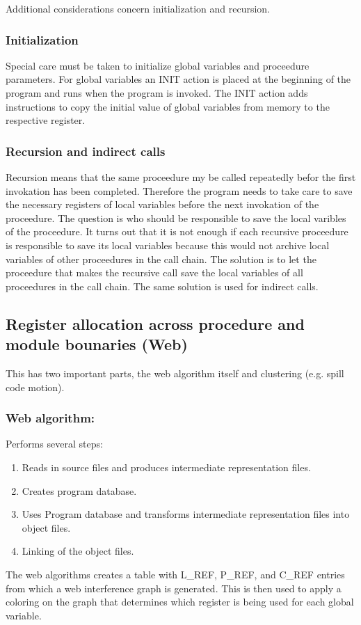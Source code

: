 \documentclass[a4paper,10pt]{article}
\begin{document}
Additional considerations concern initialization and recursion.

\subsubsection*{Initialization}
Special care must be taken to initialize global variables and proceedure parameters. For global variables an INIT action is placed at the
beginning of the program and runs when the program is invoked. The INIT action adds instructions to copy the initial value of global 
variables from memory to the respective register.

\subsubsection*{Recursion and indirect calls}
Recursion means that the same proceedure my be called repeatedly befor the first invokation has been completed. Therefore the program
needs to take care to save the necessary registers of local variables before the next invokation of the proceedure. The question is who 
should be responsible to save the local varibles of the proceedure. It turns out that it is not enough if each recursive proceedure is 
responsible to save its local variables because this would not archive local variables of other proceedures in the call chain. The 
solution is to let the proceedure that makes the recursive call save the local variables of all proceedures in the call chain. The same 
solution is used for indirect calls.

\subsection{Register allocation across procedure and module bounaries (Web)}
This has two important parts, the web algorithm itself and clustering (e.g. spill code motion).
\subsubsection*{Web algorithm:}
Performs several steps:
\begin{enumerate}
 \item Reads in source files and produces intermediate representation files.
 \item Creates program database.
 \item Uses Program database and transforms intermediate representation files into object files.
 \item Linking of the object files.
\end{enumerate}
The web algorithms creates a table with L\_REF, P\_REF, and C\_REF entries from which a web interference graph is generated. This is then
used to apply a coloring on the graph that determines which register is being used for each global variable.
\end{document}
